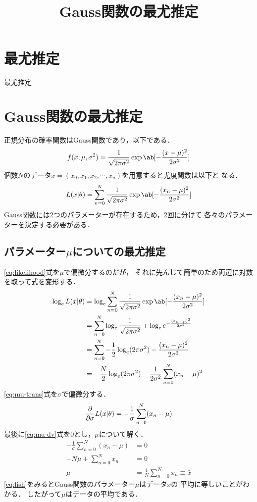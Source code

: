 \documentclass{jlreq}
\title{Gauss関数の最尤推定}
\author{}
\begin{document}
	\maketitle
	\section*{最尤推定}
		最尤推定

	\section*{Gauss関数の最尤推定}
		正規分布の確率関数はGauss関数であり，以下である．
			\begin{equation}
				f(x;\mu,\sigma^2) = \frac{1}{\sqrt{2\pi\sigma^2}}
				\exp\ab[{-\frac{(x-\mu)^2}{2\sigma^2}}] \label{eq:Gauss}
			\end{equation}
		個数\(N\)のデータ\(x=(x_0,x_1,x_2,\cdots,x_n)\)を用意すると尤度関数は以下と
		なる．
			\begin{equation}
				L(x|\theta) = \sum_{n=0}^N \frac{1}{\sqrt{2\pi\sigma^2}}
				\exp\ab[{-\frac{(x_n-\mu)^2}{2\sigma^2}}] \label{eq:likelihood}
			\end{equation}
		Gauss関数には2つのパラメーターが存在するため，2回に分けて
		各々のパラメーターを決定する必要がある．
		
		\subsection*{パラメーター\(\mu\)についての最尤推定}
			\eqref{eq:likelihood}式を\(\mu\)で偏微分するのだが，
			それに先んじて簡単のため両辺に対数を取って式を変形する．
				\begin{align}
					\log_e L(x|\theta) &= \log_e \sum_{n=0}^N 
						\frac{1}{\sqrt{2\pi\sigma^2}}
						\exp\ab[{-\frac{(x_n-\mu)^2}{2\sigma^2}}]\\
					&= \sum_{n=0}^N\log_e\frac{1}{\sqrt{2\pi\sigma^2}} +
						\log_e e^{-\frac{(x_n-\mu)^2}{2\sigma^2}}\\
					&= \sum_{n=0}^N -\frac{1}{2}\log_e(2\pi\sigma^2) -
					\frac{(x_n-\mu)^2}{2\sigma^2}\\
					&= -\frac{N}{2}\log_e(2\pi\sigma^2) -
						\frac{1}{2\sigma^2}\sum_{n=0}^N(x_n-\mu)^2\label{eq:mu-trans}
				\end{align}
			\eqref{eq:mu-trans}式を\(\sigma\)で偏微分する．
				\begin{equation}
					\pdv{}{\sigma}L(x|\theta) =
						-\frac{1}{\sigma}\sum_{n=0}^N(x_n-\mu)\label{eq:mu-dv}
				\end{equation}
			最後に\eqref{eq:mu-dv}式を0とし，\(\mu\)について解く．
				\begin{align}
					-\frac{1}{\sigma}\sum_{n=0}^N(x_n-\mu) &= 0\\
					-N\mu + \sum_{n=0}^Nx_n &= 0\\
					\mu &= \frac{1}{N}\sum_{n=0}^Nx_n \equiv \bar{x} \label{eq:fish}
				\end{align}
			\eqref{eq:fish}をみるとGauss関数のパラメーター\(\mu\)はデータ\(x\)の
			平均に等しいことがわかる．
			したがって\(\mu\)はデータの平均である．
\end{document}
